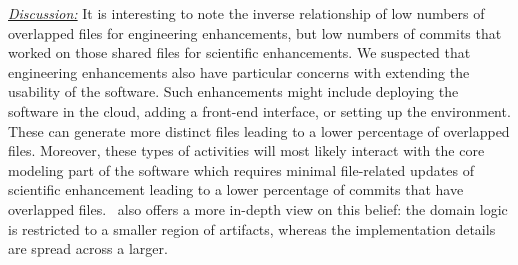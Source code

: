 \documentclass[conference,10pt]{IEEEtran}
\begin{document}
\begin{table}[!t]
\vspace{-10pt}
\centering
\caption{Given $N$ numbers of projects, the percentage of projects having overlapping percentage above a certain threshold (25\%, 33\%, 50\%) are reported for both Scientific and Engineering development.}\label{tbl:separation}
\footnotesize
{}
\vspace{-10pt}
\end{table} 

\noindent \textit{\underline{Discussion:}}  It is interesting to note the inverse relationship of low numbers of overlapped files for engineering enhancements, but low numbers of commits that worked on those shared files for scientific enhancements. We suspected that engineering enhancements also have particular concerns with extending the usability of the software. Such enhancements might include deploying the software in the cloud, adding a front-end interface, or setting up the environment. These can generate more distinct files leading to a lower percentage of overlapped files. Moreover, these types of activities will most likely interact with the core modeling part of the software which requires minimal file-related updates of scientific enhancement leading to a lower percentage of commits that have overlapped files.~ also offers a more in-depth view on this belief: the domain logic is restricted to a smaller region of artifacts, whereas the implementation details are spread across a larger.
\end{document}
